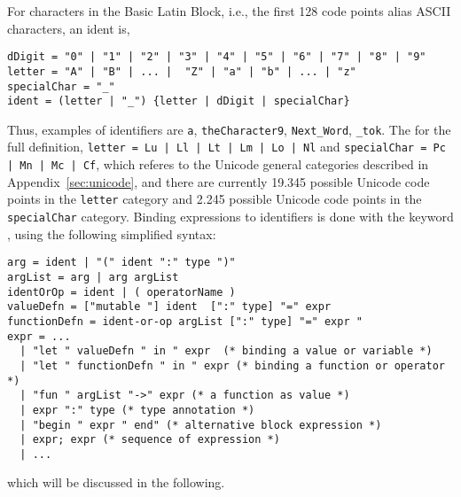 For characters in the Basic Latin Block, i.e., the first 128 code points alias ASCII characters, an ident is,
%
\begin{lstlisting}[language=ebnf]
dDigit = "0" | "1" | "2" | "3" | "4" | "5" | "6" | "7" | "8" | "9"
letter = "A" | "B" | ... |  "Z" | "a" | "b" | ... | "z"
specialChar = "_"
ident = (letter | "_") {letter | dDigit | specialChar}
\end{lstlisting}
%
Thus, examples of identifiers are \lstinline{a}, \lstinline{theCharacter9}, \lstinline{Next_Word}, \lstinline{_tok}. The for the full definition, \lstinline[language=ebnf]{letter = Lu | Ll | Lt | Lm | Lo | Nl} and \lstinline[language=ebnf]{specialChar = Pc | Mn | Mc | Cf}, which referes to the Unicode general categories described in Appendix~\ref{sec:unicode}, and there are currently 19.345 possible Unicode code points in the \lstinline[language=ebnf]{letter} category and 2.245 possible Unicode code points in the \lstinline[language=ebnf]{specialChar} category. 
Binding expressions to identifiers is done with the keyword , using the following simplified syntax:
%
\begin{lstlisting}[language=ebnf]
arg = ident | "(" ident ":" type ")"
argList = arg | arg argList
identOrOp = ident | ( operatorName )
valueDefn = ["mutable "] ident  [":" type] "=" expr
functionDefn = ident-or-op argList [":" type] "=" expr "
expr = ... 
  | "let " valueDefn " in " expr  (* binding a value or variable *)
  | "let " functionDefn " in " expr (* binding a function or operator *)
  | "fun " argList "->" expr (* a function as value *)
  | expr ":" type (* type annotation *)
  | "begin " expr " end" (* alternative block expression *)
  | expr; expr (* sequence of expression *)
  | ...
\end{lstlisting}
%
which will be discussed in the following.

